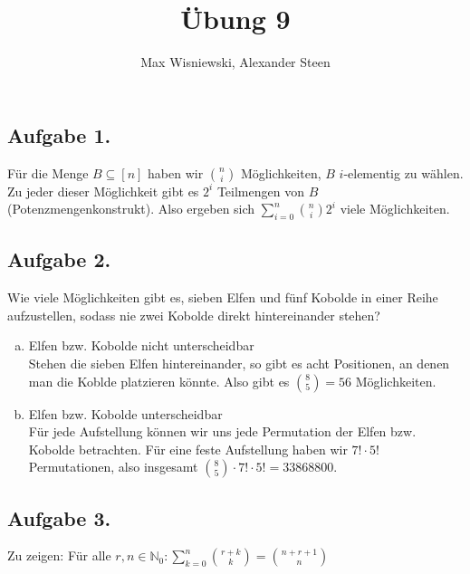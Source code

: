 \documentclass[11pt,a4paper,ngerman]{article}
\date{}
\title{Übung 9}
\author{Max Wisniewski, Alexander Steen}
\begin{document}

\renewcommand{\figurename}{Figure}

\maketitle
\thispagestyle{fancy}

\subsection*{Aufgabe 1.}
Für die Menge $B \subseteq [n]$ haben wir $\binom{n}{i}$ Möglichkeiten, $B$ $i$-elementig zu wählen.
Zu jeder dieser Möglichkeit gibt es $2^i$ Teilmengen von $B$ (Potenzmengenkonstrukt). Also ergeben
sich $\sum_{i=0}^n \binom{n}{i} 2^i$ viele Möglichkeiten.

\subsection*{Aufgabe 2.}
Wie viele Möglichkeiten gibt es, sieben Elfen und fünf Kobolde in einer Reihe aufzustellen,
sodass nie zwei Kobolde direkt hintereinander stehen?
\begin{enumerate}[a)]
\item Elfen bzw. Kobolde nicht unterscheidbar \\
    Stehen die sieben Elfen hintereinander, so gibt es acht Positionen, an denen man die Koblde
    platzieren könnte. Also gibt es $\binom{8}{5} = 56$ Möglichkeiten.
\item Elfen bzw. Kobolde unterscheidbar \\
    Für jede Aufstellung können wir uns jede Permutation der Elfen bzw. Kobolde betrachten. Für eine
    feste Aufstellung haben wir $7! \cdot 5!$ Permutationen, also insgesamt
    $\binom{8}{5} \cdot 7! \cdot 5! = 33 868 800$.
\end{enumerate}

\subsection*{Aufgabe 3.}
Zu zeigen: Für alle $r,n \in \mathbb{N}_0: \sum_{k=0}^n \binom{r+k}{k} = \binom{n+r+1}{n}$
\end{document}

